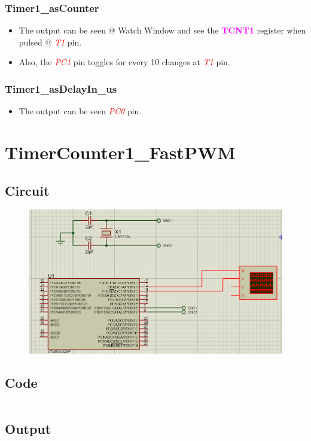 \documentclass[oneside]{book}
\newcommand{\pinFormat}[1]{\emph{\textcolor{red}{#1}}}
\newcommand{\regFormat}[1]{\textbf{\textcolor{magenta}{#1}}}
\begin{document}
\subsubsection{Timer1\_asCounter}
\begin{itemize}
    \item The output can be seen @ Watch Window and see the \regFormat{TCNT1} register when pulsed @ \pinFormat{T1} pin.
    \item Also, the \pinFormat{PC1} pin toggles for every 10 changes at \pinFormat{T1} pin.
\end{itemize}
\subsubsection{Timer1\_asDelayIn\_us}
\begin{itemize}
    \item The output can be seen \pinFormat{PC0} pin.
\end{itemize}


\section{TimerCounter1\_FastPWM}
\subsection{Circuit}
\begin{figure}[H]
    \centering
    \includegraphics[height=0.2\textheight]{TimerCounter1_FastPWM.png}
\end{figure}
\subsection{Code}
\inputminted[breaklines, bgcolor=black]{c}{./programFiles/TimerCounter1_FastPWM.c}
\subsection{Output}
\end{document}
